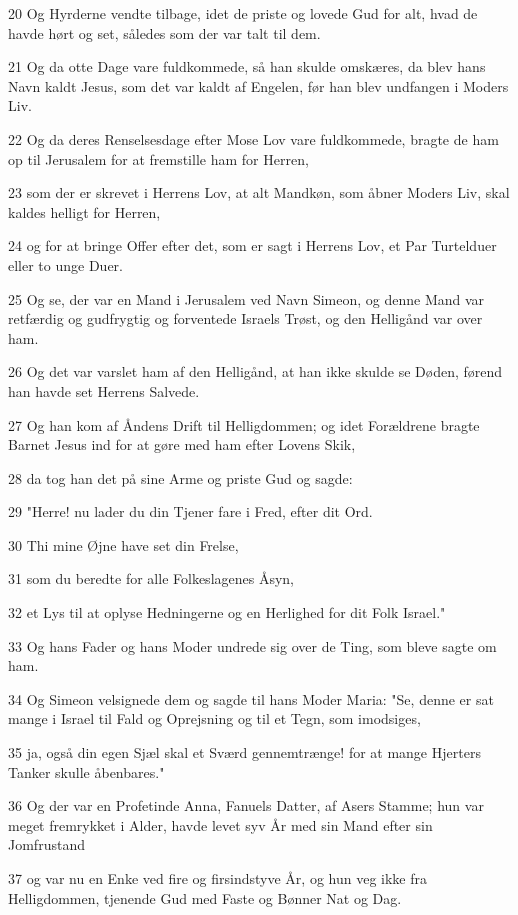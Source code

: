 \par 20 Og Hyrderne vendte tilbage, idet de priste og lovede Gud for alt, hvad de havde hørt og set, således som der var talt til dem.
\par 21 Og da otte Dage vare fuldkommede, så han skulde omskæres, da blev hans Navn kaldt Jesus, som det var kaldt af Engelen, før han blev undfangen i Moders Liv.
\par 22 Og da deres Renselsesdage efter Mose Lov vare fuldkommede, bragte de ham op til Jerusalem for at fremstille ham for Herren,
\par 23 som der er skrevet i Herrens Lov, at alt Mandkøn, som åbner Moders Liv, skal kaldes helligt for Herren,
\par 24 og for at bringe Offer efter det, som er sagt i Herrens Lov, et Par Turtelduer eller to unge Duer.
\par 25 Og se, der var en Mand i Jerusalem ved Navn Simeon, og denne Mand var retfærdig og gudfrygtig og forventede Israels Trøst, og den Helligånd var over ham.
\par 26 Og det var varslet ham af den Helligånd, at han ikke skulde se Døden, førend han havde set Herrens Salvede.
\par 27 Og han kom af Åndens Drift til Helligdommen; og idet Forældrene bragte Barnet Jesus ind for at gøre med ham efter Lovens Skik,
\par 28 da tog han det på sine Arme og priste Gud og sagde:
\par 29 "Herre! nu lader du din Tjener fare i Fred, efter dit Ord.
\par 30 Thi mine Øjne have set din Frelse,
\par 31 som du beredte for alle Folkeslagenes Åsyn,
\par 32 et Lys til at oplyse Hedningerne og en Herlighed for dit Folk Israel."
\par 33 Og hans Fader og hans Moder undrede sig over de Ting, som bleve sagte om ham.
\par 34 Og Simeon velsignede dem og sagde til hans Moder Maria: "Se, denne er sat mange i Israel til Fald og Oprejsning og til et Tegn, som imodsiges,
\par 35 ja, også din egen Sjæl skal et Sværd gennemtrænge! for at mange Hjerters Tanker skulle åbenbares."
\par 36 Og der var en Profetinde Anna, Fanuels Datter, af Asers Stamme; hun var meget fremrykket i Alder, havde levet syv År med sin Mand efter sin Jomfrustand
\par 37 og var nu en Enke ved fire og firsindstyve År, og hun veg ikke fra Helligdommen, tjenende Gud med Faste og Bønner Nat og Dag.
